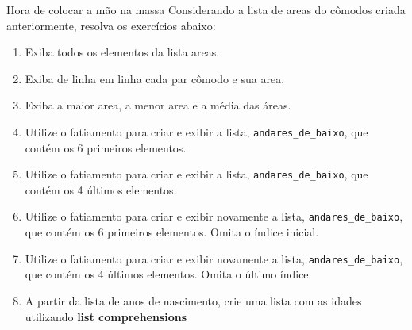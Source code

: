 \begin{frame}{Hora de colocar a mão na massa}
  Considerando a lista de areas do cômodos criada anteriormente, resolva os exercícios abaixo:
  \begin{enumerate}
    \item Exiba todos os elementos da lista areas.
    \item Exiba de linha em linha cada par cômodo e sua area.
    \item Exiba a maior area, a menor area e a média das áreas.
    \item Utilize o fatiamento para criar e exibir a lista, \verb!andares_de_baixo!, que contém os 6 primeiros elementos.
    \item Utilize o fatiamento para criar e exibir a lista, \verb!andares_de_baixo!, que contém os 4 últimos elementos. 
    \item Utilize o fatiamento para criar e exibir novamente a lista, \verb!andares_de_baixo!, que contém os 6 primeiros elementos. Omita o índice inicial.
    \item Utilize o fatiamento para criar e exibir novamente a lista, \verb!andares_de_baixo!, que contém os 4 últimos elementos. Omita o último índice.
    \item A partir da lista de anos de nascimento, crie uma lista com as idades utilizando {\bf list comprehensions}
  \end{enumerate}
\end{frame}